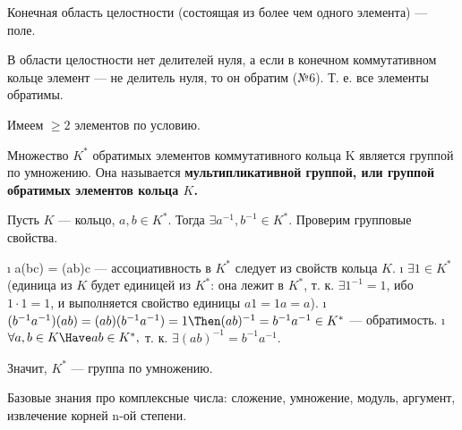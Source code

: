 \begin{problem}[7]
Конечная область целостности (состоящая из более чем одного элемента) --- поле.
\end{problem}

\begin{solution}
В области целостности нет делителей нуля, а если в конечном коммутативном кольце элемент --- не делитель нуля, то он обратим (№6). Т. е. все элементы обратимы.

Имеем \(\ge 2\) элементов по условию.
\end{solution}

\begin{problem}[8]
Множество $K^*$ обратимых элементов коммутативного кольца K является группой по умножению. Она называется \bf{мультипликативной группой}, или \bf{группой обратимых элементов} кольца $K$.
\end{problem}

\begin{solution}
Пусть \(K\) --- кольцо, \(a, b \in K^*\). Тогда \(\exists a^{-1}, b^{-1} \in K^*\). Проверим групповые свойства.

\begin{enumerate}
\def\labelenumi{\arabic{enumi}.}
\tightlist
\i
  a(bc) = (ab)c --- ассоциативность в \(K^*\) следует из свойств кольца \(K\).
\i
  \(\exists 1 \in K^*\) (единица из $K$ будет единицей из $K^*$: она лежит в $K^*$, т. к. $\exists 1^{-1} = 1$, ибо $1\cdot 1 = 1$, и выполняется свойство единицы $a1=1a=a$).
\i
  \((b^{-1}a^{-1})(ab) = (ab)(b^{-1}a^{-1})=1 \Then (ab)^{-1} = b^{-1} a^{-1} \in K^*\) --- обратимость.
\i
  \(\forall a, b \in K \Have ab \in K^*,\) т. к. $\exists (ab)^{-1} = b^{-1}a^{-1}$.
\end{enumerate}

Значит, \(K^*\) --- группа по умножению.
\end{solution}

\begin{problem}[9(1.5-1.7)]
Базовые знания про комплексные числа: сложение, умножение, модуль, аргумент, извлечение корней n-ой степени.
\end{problem}


